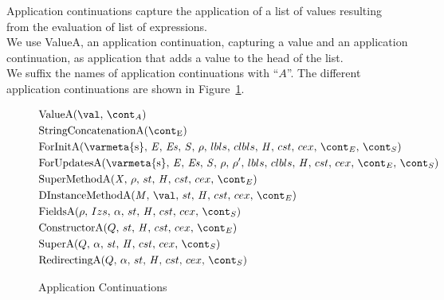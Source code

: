 \documentclass{article}
\begin{document}
Application continuations capture the application of a list of values resulting from the evaluation of list of expressions.\\
We use ValueA, an application continuation, capturing a value and an application continuation, as application that adds a value to the head of the list.\\
We suffix the names of application continuations with ``$A$''.
The different application continuations are shown in Figure~\ref{figure:acont}.
\newcommand{\ValueA}[2]{\mathrm{ValueA}({#1},\,{#2})}
\newcommand{\StringConcatenationA}{\mathrm{StringConcatenationA(\econt)}}
\newcommand{\SuperMethodA}{\mathrm{SuperMethodA}(\idmeta,\,\env,\,\ExceptionHandlers,\,\econt)}
\newcommand{\StaticInvA}[4]{\mathrm{StaticInvocationA}({#1},\,{#2},\,{#3},\,\ExceptionHandlersRest,\,{#4})}
\newcommand{\DInstanceMethodA}{\mathrm{DInstanceMethodA}(\membermeta,\,\val,\,\ExceptionHandlers,\,\econt)}
\newcommand{\FieldsA}[4]{\mathrm{FieldsA}({#1},\,{#2},\,{#3},\,\strace,\,\handler,\,\cstrace,\,\cex,\,{#4})}
\newcommand{\SuperA}[3]{\mathrm{SuperA}({#1},\,{#2},\,\strace,\,\handler,\,\cstrace,\,\cex,\,{#3})}
\newcommand{\ConstructorA}[2]{\mathrm{ConstructorA}({#1},\,\strace,\,\handler,\,\cstrace,\,\cex,\,{#2})}
\newcommand{\RedirectingA}[3]{\mathrm{RedirectingA}({#1},\,{#2},\,\strace,\,\handler,\,\cstrace,\,\cex,\,{#3})}
\newcommand{\ForInitA}{\mathrm{ForInitA}(\mathrm{\varmeta{s}},\, \expressionmeta,\, \exprs,\, \statementmeta,\, \env,\, \lbls,\, \clbls,\, \handler,\, \cstrace,\, \cex,\, \econt,\, \scont)}
%
\newcommand{\ForUpdatesA}[1]{\mathrm{ForUpdatesA}(\mathrm{\varmeta{s}},\, \expressionmeta,\, \exprs,\, \statementmeta,\, \env,\, #1,\, \lbls,\, \clbls,\, \handler,\, \cstrace,\, \cex,\, \econt,\, \scont)}
\begin{figure}[Htp]
  \begin{align}
	&\ValueA{\val}{\acont} \label{acont:value}\\
	&\StringConcatenationA \label{acont:stringconcat}\\
	&\ForInitA \label{acont:forinit}\\
	&\ForUpdatesA{\env'} \label{acont:forupdates}\\
	&\SuperMethodA \label{acont:supermethod}\\
	&\DInstanceMethodA \label{acont:staticinv}\\
	&\FieldsA{\env}{Izs}{\loc}{\scont} \label{acont:fields}\\
	&\ConstructorA{Q}{\econt} \label{acont:constructor}\\
	&\SuperA{Q}{\loc}{\scont} \label{acont:super}\\
	&\RedirectingA{Q}{\loc}{\scont} \label{acont:redirecting}
  \end{align}
  \caption{Application Continuations}
  \label{figure:acont}
\end{figure}
\end{document}
